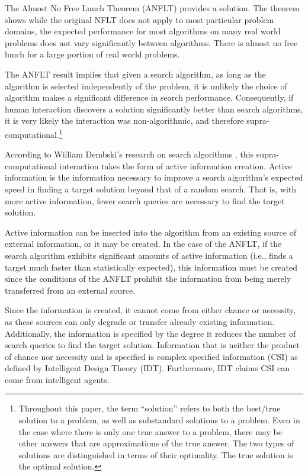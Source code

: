 The Almost No Free Lunch Theorem (ANFLT)  provides a solution.   The theorem shows while the original NFLT does not apply to most particular problem domains, the expected performance for most algorithms on many real world problems does not vary significantly between algorithms.  There is almost no free lunch for a large portion of real world problems. 

The ANFLT result implies that given a search algorithm, as long as the algorithm is selected independently of the problem, it is unlikely the choice of algorithm  makes a significant difference in search performance.  Consequently, if  human interaction discovers a solution significantly better than search algorithms, it is very likely the interaction was non-algorithmic, and therefore supra-computational.\footnote{Throughout this paper, the term ``solution'' refers to both the best/true solution to a problem, as well as substandard solutions to a problem.  Even in the case where there is only one true answer to a problem, there may be other answers that are approximations of the true answer.  The two types of solutions are distinguished in terms of their optimality.  The true solution is the optimal solution.}

According to William Dembski's research on search algorithms \citep{dembski10:_searc_for_searc}, this supra-computational interaction takes the form of active information creation.  Active information is the information necessary to improve a search algorithm's expected speed in finding a target solution beyond that of a random search.  That is, with more active information, fewer search queries are necessary to find the target solution.   

Active information can be inserted into the algorithm from an existing source of external information, or it may be created.  In the case of the ANFLT, if the search algorithm exhibits significant amounts of active information (i.e., finds a target much faster than statistically expected), this information must be created since the conditions of the ANFLT prohibit the information from being merely transferred from an external source.  

Since the information is created, it cannot come from either chance or necessity, as these sources can only degrade or transfer already existing information.  Additionally, the information is specified by the degree it reduces the number of search queries to find the target solution.  Information that is neither the product of chance nor necessity and is specified is complex specified information (CSI) \citep{dembski:_specif} as defined by Intelligent Design Theory (IDT).  Furthermore, IDT claims CSI can come from intelligent agents.

